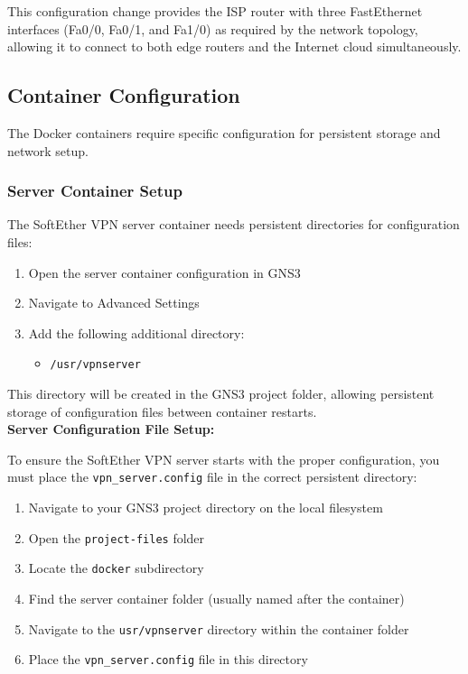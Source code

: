 This configuration change provides the ISP router with three FastEthernet interfaces (Fa0/0, Fa0/1, and Fa1/0) as required by the network topology, allowing it to connect to both edge routers and the Internet cloud simultaneously.

\subsection{Container Configuration}

The Docker containers require specific configuration for persistent storage and network setup.

\subsubsection{Server Container Setup}

The SoftEther VPN server container needs persistent directories for configuration files:

\begin{enumerate}
    \item Open the server container configuration in GNS3
    \item Navigate to Advanced Settings
    \item Add the following additional directory:
    \begin{itemize}
        \item \texttt{/usr/vpnserver}
    \end{itemize}
\end{enumerate}

\noindent
This directory will be created in the GNS3 project folder, allowing persistent storage of configuration files between container restarts.\\

\noindent
\textbf{Server Configuration File Setup:}

\noindent
To ensure the SoftEther VPN server starts with the proper configuration, you must place the \texttt{vpn\_server.config} file in the correct persistent directory:

\begin{enumerate}
    \item Navigate to your GNS3 project directory on the local filesystem
    \item Open the \texttt{project-files} folder
    \item Locate the \texttt{docker} subdirectory
    \item Find the server container folder (usually named after the container)
    \item Navigate to the \texttt{usr/vpnserver} directory within the container folder
    \item Place the \texttt{vpn\_server.config} file in this directory
\end{enumerate}

